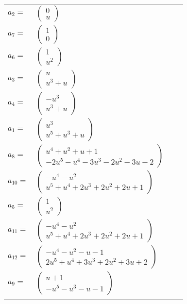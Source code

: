 \documentclass[1p]{elsarticle_modified}
\theoremstyle{definition}
\begin{document}
\begin{tabular}{m{7pt} m{180pt} m{7pt} m{180pt} }
\flushright $a_{2}=$&$\begin{pmatrix}0\\u\end{pmatrix}$ \\
\flushright $a_{7}=$&$\begin{pmatrix}1\\0\end{pmatrix}$ \\
\flushright $a_{6}=$&$\begin{pmatrix}1\\u^2\end{pmatrix}$ \\
\flushright $a_{3}=$&$\begin{pmatrix}u\\u^3+u\end{pmatrix}$ \\
\flushright $a_{4}=$&$\begin{pmatrix}- u^3\\u^3+u\end{pmatrix}$ \\
\flushright $a_{1}=$&$\begin{pmatrix}u^3\\u^5+u^3+u\end{pmatrix}$ \\
\flushright $a_{8}=$&$\begin{pmatrix}u^4+u^2+u+1\\-2 u^5- u^4-3 u^3-2 u^2-3 u-2\end{pmatrix}$ \\
\flushright $a_{10}=$&$\begin{pmatrix}- u^4- u^2\\u^5+u^4+2 u^3+2 u^2+2 u+1\end{pmatrix}$ \\
\flushright $a_{5}=$&$\begin{pmatrix}1\\u^2\end{pmatrix}$ \\
\flushright $a_{11}=$&$\begin{pmatrix}- u^4- u^2\\u^5+u^4+2 u^3+2 u^2+2 u+1\end{pmatrix}$ \\
\flushright $a_{12}=$&$\begin{pmatrix}- u^4- u^2- u-1\\2 u^5+u^4+3 u^3+2 u^2+3 u+2\end{pmatrix}$ \\
\flushright $a_{9}=$&$\begin{pmatrix}u+1\\- u^5- u^3- u-1\end{pmatrix}$\\&\end{tabular}
\end{document}
